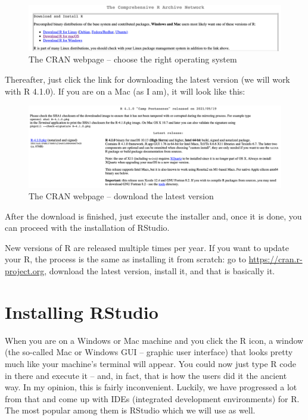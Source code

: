 \documentclass[
]{book}
\begin{document}
\begin{figure}
\centering
\includegraphics{figures/cran_1.png}
\caption{The CRAN webpage -- choose the right operating system}
\end{figure}

Thereafter, just click the link for downloading the latest version (we will work with R 4.1.0). If you are on a Mac (as I am), it will look like this:

\begin{figure}
\centering
\includegraphics{figures/cran_2.png}
\caption{The CRAN webpage -- download the latest version}
\end{figure}

After the download is finished, just execute the installer and, once it is done, you can proceed with the installation of RStudio.

New versions of R are released multiple times per year. If you want to update your R, the process is the same as installing it from scratch: go to \url{https://cran.r-project.org}, download the latest version, install it, and that is basically it.

\hypertarget{installing-rstudio}{%
\section{Installing RStudio}\label{installing-rstudio}}

When you are on a Windows or Mac machine and you click the R icon, a window (the so-called Mac or Windows GUI -- graphic user interface) that looks pretty much like your machine's terminal will appear. You could now just type R code in there and execute it -- and, in fact, that is how the users did it the ancient way. In my opinion, this is fairly inconvenient. Luckily, we have progressed a lot from that and come up with IDEs (integrated development environments) for R. The most popular among them is RStudio which we will use as well.
\end{document}
